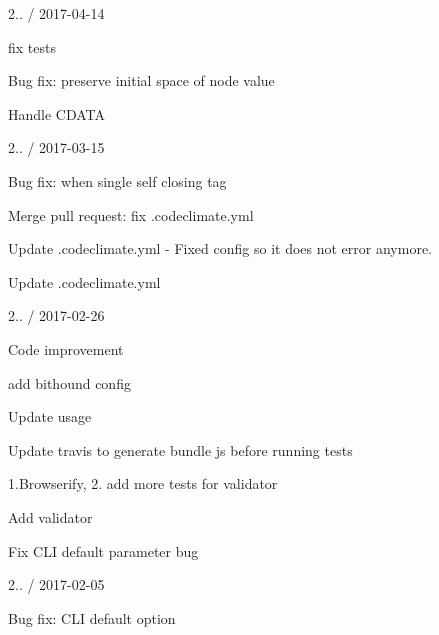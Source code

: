 2.. / 2017-\/04-\/14
\begin{DoxyItemize}
\item fix tests
\item Bug fix\+: preserve initial space of node value
\item Handle CDATA
\end{DoxyItemize}

2.. / 2017-\/03-\/15
\begin{DoxyItemize}
\item Bug fix\+: when single self closing tag
\item Merge pull request\+: fix .codeclimate.\+yml
\item Update .codeclimate.\+yml -\/ Fixed config so it does not error anymore.
\item Update .codeclimate.\+yml
\end{DoxyItemize}

2.. / 2017-\/02-\/26
\begin{DoxyItemize}
\item Code improvement
\item add bithound config
\item Update usage
\item Update travis to generate bundle js before running tests
\item 1.\+Browserify, 2. add more tests for validator
\item Add validator
\item Fix CLI default parameter bug
\end{DoxyItemize}

2.. / 2017-\/02-\/05
\begin{DoxyItemize}
\item Bug fix\+: CLI default option 
\end{DoxyItemize}